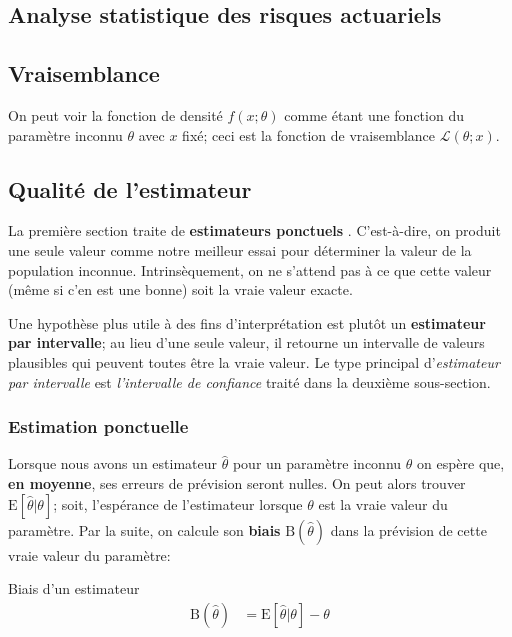 \documentclass[10pt, french]{article}
\begin{document}
\begin{multicols*}{2}

\section*{Analyse statistique des risques actuariels}

\subsection*{Vraisemblance}

On peut voir la fonction de densité $f(x; \theta)$ comme étant une fonction du paramètre inconnu $\theta$ avec $x$ fixé; ceci est la fonction de vraisemblance $\mathcal{L}(\theta; x)$.

\subsection*{Qualité de l'estimateur}

La première section traite de \guillemotleft \textbf{estimateurs ponctuels} \guillemotright. 
C'est-à-dire, on produit une seule valeur comme notre meilleur essai pour déterminer la valeur de la population inconnue.
Intrinsèquement, on ne s'attend pas à ce que cette valeur (même si c'en est une bonne) soit la vraie valeur exacte.

Une hypothèse plus utile à des fins d'interprétation est plutôt un \textbf{estimateur par intervalle}; au lieu d'une seule valeur, il retourne un intervalle de valeurs plausibles qui peuvent toutes être la vraie valeur. 
Le type principal d'\textit{estimateur par intervalle} est \textit{l'intervalle de confiance} traité dans la deuxième sous-section.

\subsubsection*{Estimation ponctuelle}

Lorsque nous avons un estimateur $\hat\theta$ pour un paramètre inconnu $\theta$ on espère que, \textbf{en moyenne}, ses erreurs de prévision seront nulles. 
On peut alors trouver $\text{E}[\hat\theta | \theta]$; soit, l'espérance de l'estimateur lorsque $\theta$ est la vraie valeur du paramètre.
Par la suite, on calcule son \textbf{biais} $\text{B}(\hat\theta)$ dans la prévision de cette vraie valeur du paramètre:
\begin{algo}{Biais d'un estimateur}
\begin{align*}
	\text{B}(\hat\theta) 
	&= 	\text{E}[\hat\theta | \theta] - \theta
\end{align*}
\end{algo}


\end{multicols*}
\end{document}
